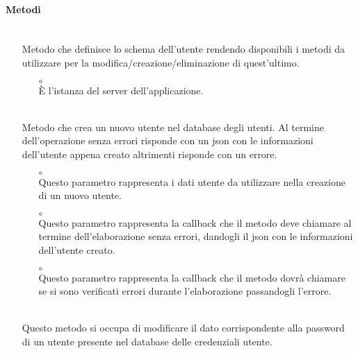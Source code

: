 \paragraph*{Metodi}
\begin{itemize}
\item[]  \\ Metodo che definisce lo schema  dell'utente rendendo disponibili i metodi da utilizzare per la modifica/creazione/eliminazione di quest'ultimo.
\begin{itemize}\addtolength{\itemsep}{-0.5\baselineskip}
\item[$\circ$]  \\ È l'istanza del server dell'applicazione.
\end{itemize}
\item[]  \\ Metodo che crea un nuovo utente nel database degli utenti. Al termine dell'operazione senza errori risponde con un json con le informazioni dell'utente appena creato altrimenti risponde con un errore. 
\begin{itemize}\addtolength{\itemsep}{-0.5\baselineskip}
\item[$\circ$]  \\ Questo parametro rappresenta i dati utente da utilizzare nella creazione di un nuovo utente.
\item[$\circ$]  \\ Questo parametro rappresenta la callback che il metodo deve chiamare al termine dell'elaborazione senza errori, dandogli il json con le informazioni dell'utente creato.
\item[$\circ$]  \\ Questo parametro rappresenta la callback che il metodo dovrà chiamare se si sono verificati errori durante l'elaborazione passandogli l'errore.
\end{itemize}
\item[]  \\ Questo metodo si occupa di modificare il dato corrispondente alla password di un utente presente nel database delle credenziali utente.
\begin{itemize}\addtolength{\itemsep}{-0.5\baselineskip}

\end{itemize}
\end{itemize}
